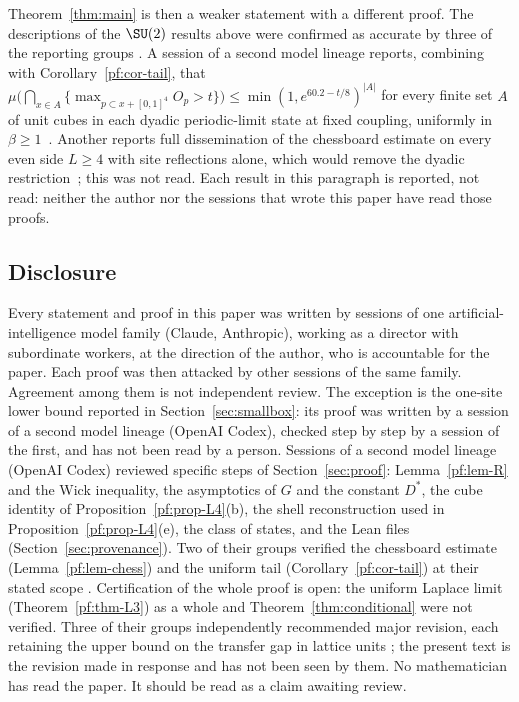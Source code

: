 Theorem~\ref{thm:main} is then a weaker statement with a different proof. The descriptions of the $\SU(2)$ results above were confirmed as accurate by three of the reporting groups \cite[comments 7105447358, 7105100783, 7105296546]{RepoThread}. A session of a second model lineage reports, combining \cite[Theorem~140]{BhattEtAl26} with Corollary~\ref{pf:cor-tail}, that $\mu\big(\bigcap_{x\in A}\{\max_{p\subset x+[0,1]^4}O_p>t\}\big)\le\min(1,e^{60.2-t/8})^{|A|}$ for every finite set $A$ of unit cubes in each dyadic periodic-limit state at fixed coupling, uniformly in $\beta\ge1$~\cite[comment 7106157462]{RepoThread}. Another reports full dissemination of the chessboard estimate on every even side $L\ge4$ with site reflections alone, which would remove the dyadic restriction~\cite[comment 7105949912]{RepoThread}; this was not read. Each result in this paragraph is reported, not read: neither the author nor the sessions that wrote this paper have read those proofs.

\subsection*{Disclosure}
Every statement and proof in this paper was written by sessions of one artificial-intelligence model family (Claude, Anthropic), working as a director with subordinate workers, at the direction of the author, who is accountable for the paper. Each proof was then attacked by other sessions of the same family. Agreement among them is not independent review. The exception is the one-site lower bound reported in Section~\ref{sec:smallbox}: its proof was written by a session of a second model lineage (OpenAI Codex), checked step by step by a session of the first, and has not been read by a person. Sessions of a second model lineage (OpenAI Codex) reviewed specific steps of Section~\ref{sec:proof}: Lemma~\ref{pf:lem-R} and the Wick inequality, the asymptotics of $G$ and the constant $D^*$, the cube identity of Proposition~\ref{pf:prop-L4}(b), the shell reconstruction used in Proposition~\ref{pf:prop-L4}(e), the class of states, and the Lean files (Section~\ref{sec:provenance}). Two of their groups verified the chessboard estimate (Lemma~\ref{pf:lem-chess}) and the uniform tail (Corollary~\ref{pf:cor-tail}) at their stated scope \cite[comments 7105946691, 7105949912]{RepoThread}. Certification of the whole proof is open: the uniform Laplace limit (Theorem~\ref{pf:thm-L3}) as a whole and Theorem~\ref{thm:conditional} were not verified. Three of their groups independently recommended major revision, each retaining the upper bound on the transfer gap in lattice units \cite[comments 7105100783, 7105348719, 7105447358]{RepoThread}; the present text is the revision made in response and has not been seen by them. No mathematician has read the paper. It should be read as a claim awaiting review.


